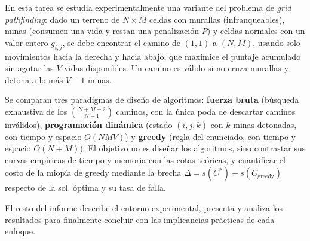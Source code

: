 
En esta tarea se estudia experimentalmente una variante del problema de \emph{grid pathfinding}: dado un terreno de $N\times M$ celdas con murallas (infranqueables), minas (consumen una vida y restan una penalización $P$) y celdas normales con un valor entero $g_{i,j}$, se debe encontrar el camino de $(1,1)$ a $(N,M)$, usando solo movimientos hacia la derecha y hacia abajo, que maximice el puntaje acumulado sin agotar las $V$ vidas disponibles. Un camino es válido si no cruza murallas y detona a lo más $V-1$ minas.

Se comparan tres paradigmas de diseño de algoritmos: \textbf{fuerza bruta} (búsqueda exhaustiva de los $\binom{N+M-2}{N-1}$ caminos, con la única poda de descartar caminos inválidos), \textbf{programación dinámica} (estado $(i,j,k)$ con $k$ minas detonadas, con tiempo y espacio $O(NMV)$) y \textbf{greedy} (regla del enunciado, con tiempo y espacio $O(N+M)$). El objetivo no es diseñar los algoritmos, sino contrastar sus curvas empíricas de tiempo y memoria con las cotas teóricas, y cuantificar el costo de la miopía de greedy mediante la brecha $\Delta = s(C^*) - s(C_{\text{greedy}})$ respecto de la sol. óptima y su tasa de falla.

El resto del informe describe el entorno experimental, presenta y analiza los resultados para finalmente concluir con las implicancias prácticas de cada enfoque.
